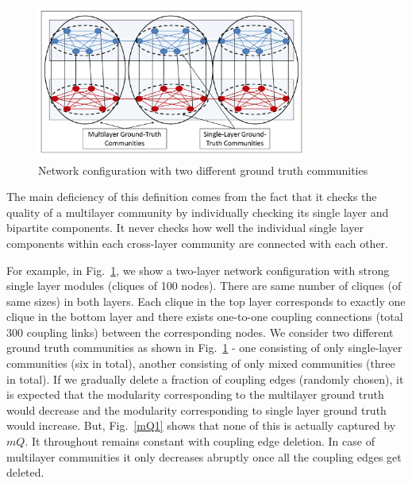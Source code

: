 \begin{figure}
\centering
\includegraphics[width=3.5in]{./images/motivation.pdf}
\vspace{-0.1in}
\caption{Network configuration with two different ground truth communities}
\vspace{-0.1in}
\label{N0}
\end{figure}




The main deficiency of this definition comes from the fact that it checks the quality of a multilayer community 
by individually checking its 
single layer and bipartite components. It never checks how well the individual single layer components within each cross-layer community
are connected with each other.

For example, in Fig.~\ref{N0}, we show a two-layer network configuration with strong single layer modules (cliques of 100 nodes). 
There are same number of cliques (of same sizes) in both layers. Each clique in the top layer corresponds to exactly one clique in 
the bottom layer 
and there exists one-to-one coupling connections (total 300 coupling links) between the corresponding nodes.
We consider two different ground truth communities as shown in Fig.~\ref{N0} - one consisting of only single-layer communities 
(six in total), another 
consisting of only mixed communities (three in total).
If we gradually delete a fraction of coupling edges (randomly chosen), it is expected that the modularity corresponding 
to the multilayer ground truth would decrease and the modularity corresponding to single layer ground truth would 
increase. But, Fig.~\ref{mQ1} shows that 
none of this is actually captured by $mQ$. It throughout remains constant with coupling edge deletion. 
In case of multilayer communities it only decreases abruptly once all the coupling edges get deleted. 

